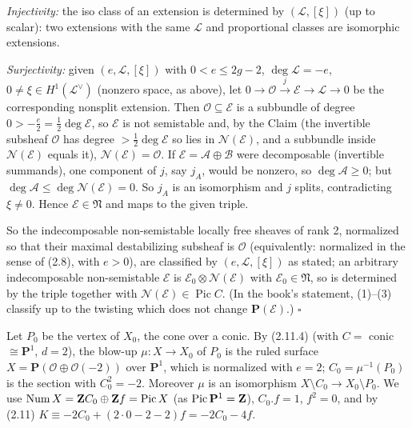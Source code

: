 \documentclass[11pt]{article}
\begin{document}
\emph{Injectivity:} the iso class of an extension is determined by $(\mathcal L,[\xi])$ (up to scalar): two extensions with the same $\mathcal L$ and proportional classes are isomorphic extensions.

\emph{Surjectivity:} given $(e,\mathcal L,[\xi])$ with $0<e\le2g-2$, $\deg\mathcal L=-e$, $0\ne\xi\in H^1(\mathcal L^\vee)$ (nonzero space, as above), let $0\to\mathcal O\xrightarrow{j}\mathcal E\to\mathcal L\to0$ be the corresponding nonsplit extension. Then $\mathcal O\subseteq\mathcal E$ is a subbundle of degree $0>-\frac e2=\frac12\deg\mathcal E$, so $\mathcal E$ is not semistable and, by the Claim (the invertible subsheaf $\mathcal O$ has degree $>\frac12\deg\mathcal E$ so lies in $\mathcal N(\mathcal E)$, and a subbundle inside $\mathcal N(\mathcal E)$ equals it), $\mathcal N(\mathcal E)=\mathcal O$. If $\mathcal E=\mathcal A\oplus\mathcal B$ were decomposable (invertible summands), one component of $j$, say $j_A$, would be nonzero, so $\deg\mathcal A\ge0$; but $\deg\mathcal A\le\deg\mathcal N(\mathcal E)=0$. So $j_A$ is an isomorphism and $j$ splits, contradicting $\xi\ne0$. Hence $\mathcal E\in\mathfrak N$ and maps to the given triple.

So the indecomposable non-semistable locally free sheaves of rank 2, normalized so that their maximal destabilizing subsheaf is $\mathcal O$ (equivalently: normalized in the sense of (2.8), with $e>0$), are classified by $(e,\mathcal L,[\xi])$ as stated; an arbitrary indecomposable non-semistable $\mathcal E$ is $\mathcal E_0\otimes\mathcal N(\mathcal E)$ with $\mathcal E_0\in\mathfrak N$, so is determined by the triple together with $\mathcal N(\mathcal E)\in\operatorname{Pic}C$. (In the book's statement, (1)--(3) classify up to the twisting which does not change $\mathbf P(\mathcal E)$.) \hfill$\square$

\pf
Let $P_0$ be the vertex of $X_0$, the cone over a conic. By (2.11.4) (with $C=$ conic $\cong\mathbf P^1$, $d=2$), the blow-up $\mu\colon X\to X_0$ of $P_0$ is the ruled surface $X=\mathbf P(\mathcal O\oplus\mathcal O(-2))$ over $\mathbf P^1$, which is normalized with $e=2$; $C_0=\mu^{-1}(P_0)$ is the section with $C_0^2=-2$. Moreover $\mu$ is an isomorphism $X\setminus C_0\to X_0\setminus P_0$. We use $\operatorname{Num}X=\mathbf Z C_0\oplus\mathbf Z f=\operatorname{Pic}X$ (as $\operatorname{Pic}\mathbf P^1=\mathbf Z$), $C_0.f=1$, $f^2=0$, and by (2.11) $K\equiv-2C_0+(2\cdot0-2-2)f=-2C_0-4f$.
\end{document}
